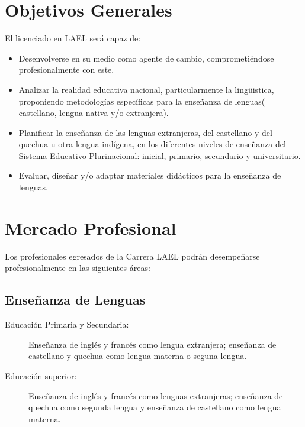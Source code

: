 \section{Objetivos Generales}

El licenciado en LAEL ser\'{a} capaz de:

\begin{itemize}

\item Desenvolverse en su medio como agente de cambio, comprometi\'{e}ndose 
profesionalmente con este.
\item Analizar la realidad educativa nacional, particularmente la ling\"{u}istica,
proponiendo metodolog\'{i}as espec\'{i}ficas para la ense\~{n}anza de lenguas( 
castellano, lengua nativa y/o extranjera).
\item Planificar la ense\~{n}anza de las lenguas extranjeras, del castellano y 
del quechua u otra lengua ind\'{i}gena, en los diferentes niveles de ense\~{n}anza
del Sistema Educativo Plurinacional: inicial, primario, secundario y universitario.
\item Evaluar, dise\~{n}ar y/o adaptar materiales did\'{a}cticos para la 
ense\~{n}anza de lenguas.

\end{itemize}

\section{Mercado Profesional}

Los profesionales egresados de la Carrera LAEL podr\'{a}n desempe\~{n}arse 
profesionalmente en las siguientes \'{a}reas:

\subsection{Ense\~{n}anza de Lenguas}

\begin{description}

\item[Educaci\'{o}n Primaria y Secundaria:] Ense\~{n}anza de ingl\'{e}s y 
franc\'{e}s como lengua extranjera; ense\~{n}anza de castellano y quechua
como lengua materna o seguna lengua.
\item[Educaci\'{o}n superior:] Ense\~{n}anza de ingl\'{e}s y franc\'{e}s como 
lenguas extranjeras; ense\~{n}anza de quechua como segunda lengua y ense\~{n}anza
de castellano como lengua materna.

\end{description}

